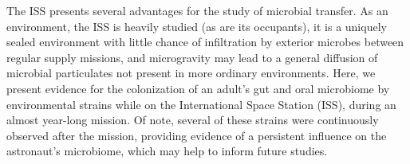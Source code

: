 The ISS presents several advantages for the study of microbial transfer. As an environment, the ISS is heavily studied (as are its occupants), it is a uniquely sealed environment with little chance of infiltration by exterior microbes between regular supply missions, and microgravity may lead to a general diffusion of microbial particulates not present in more ordinary environments. Here,  we present evidence for the colonization of an adult's gut and oral microbiome by environmental strains while on the International Space Station (ISS), during an almost year-long mission\citep{garrett2019nasa}. Of note, several of these strains were continuously observed after the mission, providing evidence of a persistent influence on the astronaut's microbiome, which may help to inform future studies.
